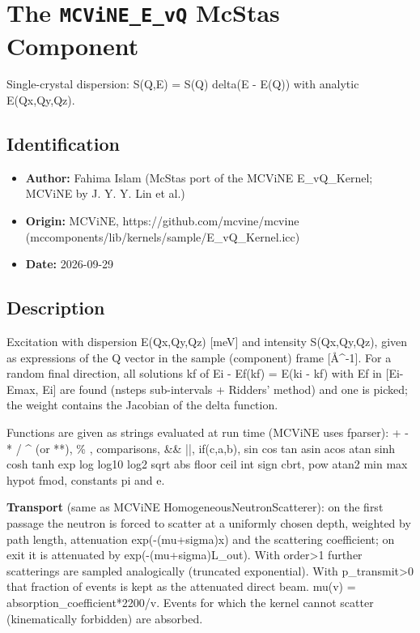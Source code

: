 \section{The \texttt{MCViNE\_E\_vQ} McStas Component}
Single-crystal dispersion: S(Q,E) = S(Q) delta(E - E(Q)) with analytic E(Qx,Qy,Qz).

\subsection*{Identification}
\begin{itemize}
  \item \textbf{Author:} Fahima Islam (McStas port of the MCViNE E\_vQ\_Kernel; MCViNE by J. Y. Y. Lin et al.)
  \item \textbf{Origin:} MCViNE, https://github.com/mcvine/mcvine (mccomponents/lib/kernels/sample/E\_vQ\_Kernel.icc)
  \item \textbf{Date:} 2026-09-29
\end{itemize}

\subsection*{Description}
Excitation with dispersion E(Qx,Qy,Qz) [meV] and intensity S(Qx,Qy,Qz), given as expressions of the Q vector in the sample (component) frame [\AA{}\textasciicircum{}-1]. For a random final direction, all solutions kf of Ei - Ef(kf) = E(ki - kf) with Ef in [Ei-Emax, Ei] are found (nsteps sub-intervals + Ridders' method) and one is picked; the weight contains the Jacobian of the delta function.

Functions are given as strings evaluated at run time (MCViNE uses fparser): + - * / \textasciicircum{} (or **), \% , comparisons, \&\& ||, if(c,a,b), sin cos tan asin acos atan sinh cosh tanh exp log log10 log2 sqrt abs floor ceil int sign cbrt, pow atan2 min max hypot fmod, constants pi and e.

\textbf{Transport} (same as MCViNE HomogeneousNeutronScatterer): on the first passage the neutron is forced to scatter at a uniformly chosen depth, weighted by path length, attenuation exp(-(mu+sigma)x) and the scattering coefficient; on exit it is attenuated by exp(-(mu+sigma)L\_out). With order\textgreater{}1 further scatterings are sampled analogically (truncated exponential). With p\_transmit\textgreater{}0 that fraction of events is kept as the attenuated direct beam. mu(v) = absorption\_coefficient*2200/v. Events for which the kernel cannot scatter (kinematically forbidden) are absorbed.

